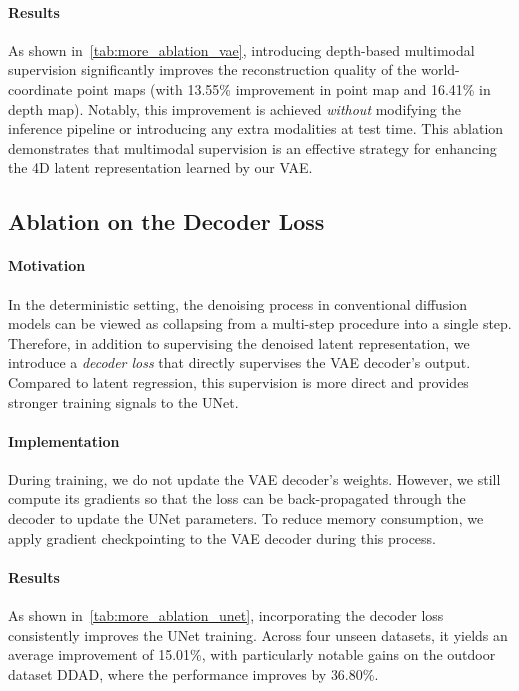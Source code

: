 \paragraph{Results}
As shown in~\cref{tab:more_ablation_vae}, introducing depth-based multimodal supervision 
significantly improves the reconstruction quality of the world-coordinate point maps (with 13.55\% improvement in point map and 16.41\% in depth map).
Notably, this improvement is achieved \emph{without} modifying the inference pipeline or introducing any extra modalities at test time.
This ablation demonstrates that multimodal supervision is an effective strategy for enhancing the 4D latent representation learned by our VAE.



\subsection{Ablation on the Decoder Loss}

\paragraph{Motivation}
In the deterministic setting, the denoising process in conventional diffusion models can be viewed as collapsing from a multi-step procedure into a single step. 
Therefore, in addition to supervising the denoised latent representation, we introduce a \emph{decoder loss} that directly supervises the VAE decoder's output. 
Compared to latent regression, this supervision is more direct and provides stronger training signals to the UNet.

\paragraph{Implementation}
During training, we do not update the VAE decoder's weights. 
However, we still compute its gradients so that the loss can be back-propagated through the decoder to update the UNet parameters. 
To reduce memory consumption, we apply gradient checkpointing to the VAE decoder during this process.

\paragraph{Results}
As shown in~\cref{tab:more_ablation_unet}, incorporating the decoder loss consistently improves the UNet training. 
Across four unseen datasets, it yields an average improvement of {15.01\%}, with particularly notable gains on the outdoor dataset DDAD, where the performance improves by {36.80\%}.

